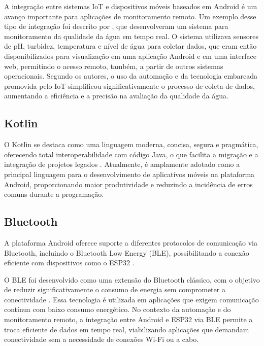 A integração entre sistemas IoT e dispositivos móveis baseados em Android é um avanço importante para aplicações de monitoramento remoto. Um exemplo desse tipo de integração foi descrito por , que desenvolveram um sistema para monitoramento da qualidade da água em tempo real. O sistema utilizava sensores de pH, turbidez, temperatura e nível de água para coletar dados, que eram então disponibilizados para visualização em uma aplicação Android e em uma interface web, permitindo o acesso remoto, também, a partir de outros sistemas operacionais. Segundo os autores, o uso da automação e da tecnologia embarcada promovida pelo IoT simplificou significativamente o processo de coleta de dados, aumentando a eficiência e a precisão na avaliação da qualidade da água.

\subsection{Kotlin}

O Kotlin se destaca como uma linguagem moderna, concisa, segura e pragmática, oferecendo total interoperabilidade com código Java, o que facilita a migração e a integração de projetos legados \cite{JEMEROV2017}. Atualmente, é amplamente adotado como a principal linguagem para o desenvolvimento de aplicativos móveis na plataforma Android, proporcionando maior produtividade e reduzindo a incidência de erros comuns durante a programação.

\subsection{Bluetooth}

A plataforma Android oferece suporte a diferentes protocolos de comunicação via Bluetooth, incluindo o Bluetooth Low Energy (BLE), possibilitando a conexão eficiente com dispositivos como o ESP32 \cite{android_bluetooth_overview}.

O BLE foi desenvolvido como uma extensão do Bluetooth clássico, com o objetivo de reduzir significativamente o consumo de energia sem comprometer a conectividade \cite{heydon2012bluetooth}. Essa tecnologia é utilizada em aplicações que exigem comunicação contínua com baixo consumo energético. No contexto da automação e do monitoramento remoto, a integração entre Android e ESP32 via BLE permite a troca eficiente de dados em tempo real, viabilizando aplicações que demandam conectividade sem a necessidade de conexões Wi-Fi ou a cabo.

